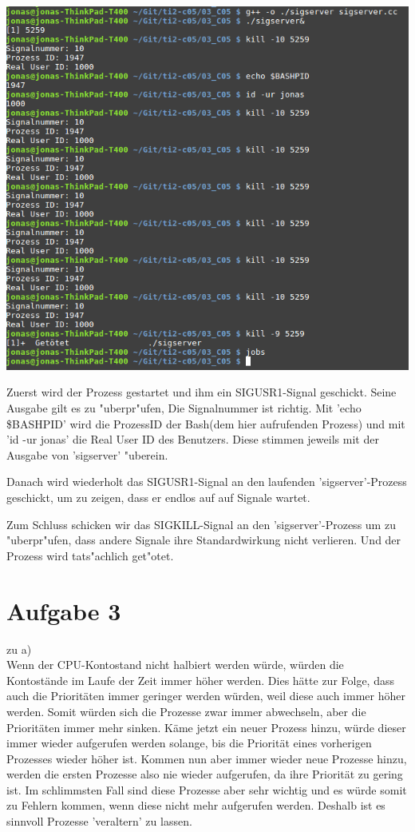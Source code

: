 \documentclass{ti2}
\begin{document}


\begin{minipage}{\linewidth}
	\centering%
	\includegraphics[width=\textwidth]{A2test.png}
\end{minipage}

Zuerst wird der Prozess gestartet und ihm ein SIGUSR1-Signal geschickt.
Seine Ausgabe gilt es zu "uberpr"ufen, Die Signalnummer ist richtig. Mit 'echo \$BASHPID' wird die ProzessID der Bash(dem hier aufrufenden Prozess) und mit 'id -ur jonas' die Real User ID des Benutzers. Diese stimmen jeweils mit der Ausgabe von 'sigserver' "uberein.

Danach wird wiederholt das SIGUSR1-Signal an den laufenden 'sigserver'-Prozess geschickt, um zu zeigen, dass er endlos auf auf Signale wartet.  

Zum Schluss schicken wir das SIGKILL-Signal an den 'sigserver'-Prozess	um zu "uberpr"ufen, dass andere Signale ihre Standardwirkung nicht verlieren. Und der Prozess wird tats"achlich get"otet.
\section*{Aufgabe 3}
zu a) \\
Wenn der CPU-Kontostand nicht halbiert werden würde, würden die Kontostände im Laufe der Zeit immer höher werden. Dies hätte zur Folge, dass auch die Prioritäten immer geringer werden würden, weil diese auch immer höher werden. Somit würden sich die Prozesse zwar immer abwechseln, aber die Prioritäten immer mehr sinken. Käme jetzt ein neuer Prozess hinzu, würde dieser immer wieder aufgerufen werden solange, bis die Priorität eines vorherigen Prozesses wieder höher ist. Kommen nun aber immer wieder neue Prozesse hinzu, werden die ersten Prozesse also nie wieder aufgerufen, da ihre Priorität zu gering ist. Im schlimmsten Fall sind diese Prozesse aber sehr wichtig und es würde somit zu Fehlern kommen, wenn diese nicht mehr aufgerufen werden. Deshalb ist es sinnvoll Prozesse 'veraltern' zu lassen.
\end{document}

